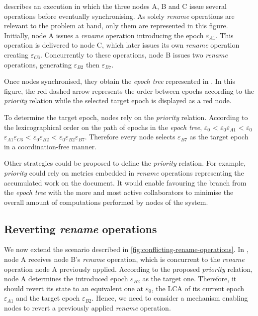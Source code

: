 \documentclass[10pt,journal,compsoc]{IEEEtran}
\newcommand{\epoch}[1]{$\varepsilon_{#1}$}
\begin{document}
 describes an execution in which the three nodes A, B and C issue several operations before eventually synchronising.
As solely \emph{rename} operations are relevant to the problem at hand, only them are represented in this figure.
Initially, node A issues a \emph{rename} operation introducing the epoch \epoch{A1}.
This operation is delivered to node C, which later issues its own \emph{rename} operation creating \epoch{C6}.
Concurrently to these operations, node B issues two \emph{rename} operations, generating \epoch{B2} then \epoch{B7}.

Once nodes synchronised, they obtain the \emph{epoch tree} represented in .
In this figure, the red dashed arrow represents the order between epochs according to the \emph{priority} relation while the selected target epoch is displayed as a red node.

To determine the target epoch, nodes rely on the \emph{priority} relation.
According to the lexicographical order on the path of epochs in the \emph{epoch tree}, \epoch{0} < \epoch{0}\epoch{A1} < \epoch{0}\epoch{A1}\epoch{C6} < \epoch{0}\epoch{B2} < \epoch{0}\epoch{B2}\epoch{B7}.
Therefore every node selects \epoch{B7} as the target epoch in a coordination-free manner.

Other strategies could be proposed to define the \emph{priority} relation.
For example, \emph{priority} could rely on metrics embedded in \emph{rename} operations representing the accumulated work on the document.
It would enable favouring the branch from the \emph{epoch tree} with the more and most active collaborators to minimise the overall amount of computations performed by nodes of the system.

\subsection{Reverting \emph{rename} operations}

\label{sec:reverting-rename-ops}

We now extend the scenario described in \autoref{fig:conflicting-rename-operations}.
In , node A receives node B's \emph{rename} operation, which is concurrent to the \emph{rename} operation node A previously applied.
According to the proposed \emph{priority} relation, node A determines the introduced epoch \epoch{B2} as the target one.
Therefore, it should revert its state to an equivalent one at \epoch{0}, the \ac{LCA} of its current epoch \epoch{A1} and the target epoch \epoch{B2}.
Hence, we need to consider a mechanism enabling nodes to revert a previously applied \emph{rename} operation.
\end{document}
